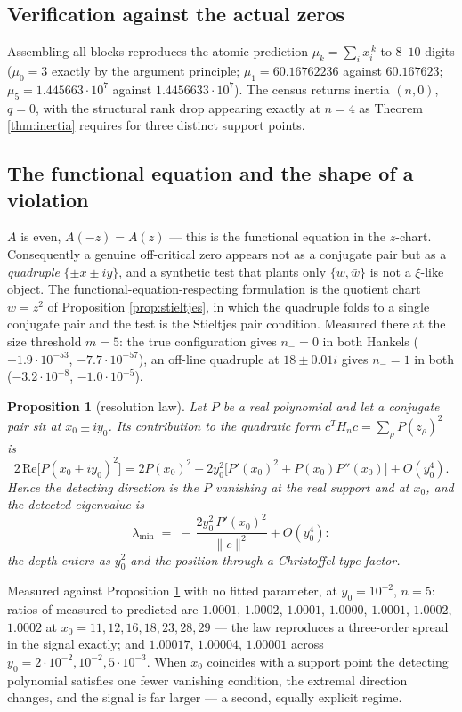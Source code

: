 \documentclass[11pt]{article}
\theoremstyle{plain}
\newtheorem{proposition}[theorem]{Proposition}
\theoremstyle{definition}
\theoremstyle{remark}
\begin{document}
\subsection{Verification against the actual zeros}

Assembling all blocks reproduces the atomic prediction
$\mu_k=\sum_i x_i^{\,k}$ to $8$--$10$ digits ($\mu_0=3$ exactly by the
argument principle; $\mu_1=60.16762236$ against $60.167623$; $\mu_5=
1.445663\cdot10^{7}$ against $1.4456633\cdot10^{7}$). The census returns
inertia $(n,0)$, $q=0$, with the structural rank drop appearing exactly at
$n=4$ as Theorem \ref{thm:inertia} requires for three distinct support points.

\subsection{The functional equation and the shape of a violation}

$A$ is even, $A(-z)=A(z)$ --- this is the functional equation in the
$z$-chart. Consequently a genuine off-critical zero appears not as a
conjugate pair but as a \emph{quadruple} $\{\pm x\pm iy\}$, and a synthetic
test that plants only $\{w,\bar w\}$ is not a $\xi$-like object. The
functional-equation-respecting formulation is the quotient chart $w=z^2$ of
Proposition \ref{prop:stieltjes}, in which the quadruple folds to a single
conjugate pair and the test is the Stieltjes pair condition. Measured there
at the size threshold $m=5$: the true configuration gives $n_-=0$ in both
Hankels ($-1.9\cdot10^{-53}$, $-7.7\cdot10^{-57}$), an off-line quadruple at
$18\pm0.01i$ gives $n_-=1$ in both ($-3.2\cdot10^{-8}$, $-1.0\cdot10^{-5}$).

\begin{proposition}[resolution law]\label{prop:resolution}
Let $P$ be a real polynomial and let a conjugate pair sit at $x_0\pm iy_0$.
Its contribution to the quadratic form $c^{T}H_nc=\sum_\rho P(z_\rho)^2$ is
\[
  2\,\mathrm{Re}\bigl[P(x_0+iy_0)^2\bigr]
  = 2P(x_0)^2-2y_0^2\bigl[P'(x_0)^2+P(x_0)P''(x_0)\bigr]+O(y_0^4).
\]
Hence the detecting direction is the $P$ vanishing at the real support and at
$x_0$, and the detected eigenvalue is
\[
  \lambda_{\min}\;=\;-\,\frac{2y_0^2\,P'(x_0)^2}{\|c\|^2}+O(y_0^4):
\]
the depth enters as $y_0^2$ and the position through a Christoffel-type
factor.
\end{proposition}

Measured against Proposition \ref{prop:resolution} with no fitted parameter,
at $y_0=10^{-2}$, $n=5$: ratios of measured to predicted are $1.0001$,
$1.0002$, $1.0001$, $1.0000$, $1.0001$, $1.0002$, $1.0002$ at
$x_0=11,12,16,18,23,28,29$ --- the law reproduces a three-order spread in the
signal exactly; and $1.00017$, $1.00004$, $1.00001$ across
$y_0=2\cdot10^{-2},10^{-2},5\cdot10^{-3}$. When $x_0$ coincides with a support
point the detecting polynomial satisfies one fewer vanishing condition, the
extremal direction changes, and the signal is far larger --- a second, equally
explicit regime.
\end{document}
